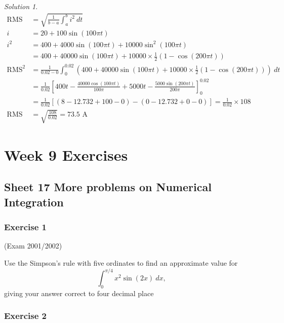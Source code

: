 \documentclass[
  11pt,
  oneside]{book}
\newcommand{\slide}{}
\theoremstyle{definition}
\theoremstyle{definition}
\theoremstyle{definition}
\theoremstyle{definition}
\theoremstyle{remark}
\newtheorem*{solution}{Solution}
\begin{document}
\begin{solution}
\begin{align*}
\text{RMS}&= \sqrt{\frac{1}{b-a}\int_a^b i^2\ dt}\\
i&=20+100\sin(100\pi t)\\
i^2&=400+4000\sin(100\pi t)+10000\sin^2(100\pi t)\\
&=400+40000\sin(100\pi t)+10000\times\frac 12(1-\cos(200\pi t))\\
\text{RMS}^2&=\frac1{0.02-0}\int_0^{0.02}(400+40000\sin(100\pi t)+10000\times\frac 12(1-\cos(200\pi t)))\ dt\\
&=\frac1{0.02}\left[400t-\frac{40000\cos(100\pi t)}{100\pi}+5000t-\frac{5000\sin(200\pi t)}{200\pi}\right]_0^{0.02}\\
&=\frac1{0.02}\left[(8-12.732+100-0)-(0-12.732+0-0)\right] = \frac1{0.02}\times108\\
\text{RMS}&=\sqrt{\frac{108}{0.02}}=73.5\text{ A}
\end{align*}
\end{solution}

\chapter*{Week 9 Exercises}\label{week-9-exercises}

\section{Sheet 17 More problems on Numerical Integration}\label{sheet-17-more-problems-on-numerical-integration}

\slide

\subsection*{Exercise 1}\label{exercise-1-8}

(Exam 2001/2002)

Use the Simpson's rule with five ordinates to find an approximate value for
\[
\int_0^{\pi/4}x^2\sin(2x)\ dx,
\]
giving your answer correct to four decimal place

\slide

\subsection*{Exercise 2}\label{exercise-2-8}
\end{document}
